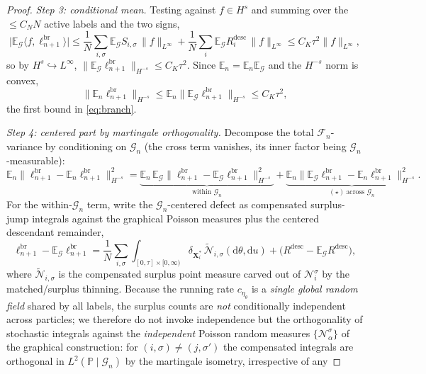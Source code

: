 \documentclass[a4paper,fleqn]{cas-sc}
\theoremstyle{definition}
\theoremstyle{remark}
\begin{document}
\begin{proof}
\emph{Step 3: conditional mean.} Testing against $f\in H^s$ and summing over the
$\le C_NN$ active labels and the two signs,
\[
\bigl|\mathbb E_{\mathcal G}\langle f,\ell^{\mathrm{br}}_{n+1}\rangle\bigr|
\le\frac1N\sum_{i,\sigma}\mathbb E_{\mathcal G}S_{i,\sigma}\,\|f\|_{L^\infty}
+\frac1N\sum_i\mathbb E_{\mathcal G}R^{\mathrm{desc}}_i\,\|f\|_{L^\infty}
\le C_K\tau^2\|f\|_{L^\infty},
\]
so by $H^s\hookrightarrow L^\infty$,
$\|\mathbb E_{\mathcal G}\ell^{\mathrm{br}}_{n+1}\|_{H^{-s}}\le C_K\tau^2$. Since
$\mathbb E_n=\mathbb E_n\mathbb E_{\mathcal G}$ and the $H^{-s}$ norm is convex,
\[
\|\mathbb E_n\ell^{\mathrm{br}}_{n+1}\|_{H^{-s}}
\le\mathbb E_n\|\mathbb E_{\mathcal G}\ell^{\mathrm{br}}_{n+1}\|_{H^{-s}}\le C_K\tau^2,
\]
the first bound in \eqref{eq:branch}.

\emph{Step 4: centered part by martingale orthogonality.} Decompose the total
$\mathcal F_n$-variance by conditioning on $\mathcal G_n$ (the cross term vanishes,
its inner factor being $\mathcal G_n$-measurable):
\[
\mathbb E_n\bigl\|\ell^{\mathrm{br}}_{n+1}-\mathbb E_n\ell^{\mathrm{br}}_{n+1}\bigr\|_{H^{-s}}^2
=\underbrace{\mathbb E_n\,\mathbb E_{\mathcal G}\bigl\|\ell^{\mathrm{br}}_{n+1}
-\mathbb E_{\mathcal G}\ell^{\mathrm{br}}_{n+1}\bigr\|_{H^{-s}}^2}_{\text{within }\mathcal G_n}
+\underbrace{\mathbb E_n\bigl\|\mathbb E_{\mathcal G}\ell^{\mathrm{br}}_{n+1}
-\mathbb E_n\ell^{\mathrm{br}}_{n+1}\bigr\|_{H^{-s}}^2}_{(\star)\ \text{across }\mathcal G_n}.
\]
For the within-$\mathcal G_n$ term, write the $\mathcal G_n$-centered defect as
compensated surplus-jump integrals against the graphical Poisson measures plus the
centered descendant remainder,
\[
\ell^{\mathrm{br}}_{n+1}-\mathbb E_{\mathcal G}\ell^{\mathrm{br}}_{n+1}
=\frac1N\sum_{i,\sigma}\int_{[0,\tau]\times[0,\infty)}\delta_{\mathbf X^*_i}\,
\widetilde{\mathcal N}_{i,\sigma}(\mathrm d\theta,\mathrm du)
+\bigl(R^{\mathrm{desc}}-\mathbb E_{\mathcal G}R^{\mathrm{desc}}\bigr),
\]
where $\widetilde{\mathcal N}_{i,\sigma}$ is the compensated surplus point measure
carved out of $\mathcal N^\sigma_i$ by the matched/surplus thinning. Because the
running rate $c_{\eta_\theta}$ is a \emph{single global random field} shared by all
labels, the surplus counts are \emph{not} conditionally independent across
particles; we therefore do not invoke independence but the orthogonality of
stochastic integrals against the \emph{independent} Poisson random measures
$\{\mathcal N^\sigma_\alpha\}$ of the graphical construction: for
$(i,\sigma)\ne(j,\sigma')$ the compensated integrals are orthogonal in
$L^2(\mathbb P\mid\mathcal G_n)$ by the martingale isometry, irrespective of any

\end{proof}
\end{document}

